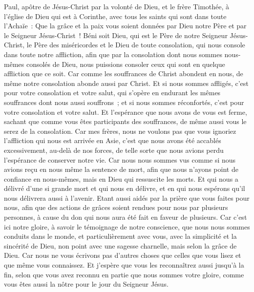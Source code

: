 \begin{multicols}{2}
\VerseOne{}Paul, apôtre de Jésus-Christ par la volonté de Dieu, et le frère Timothée, à l'église de Dieu qui est à Corinthe, avec tous les saints qui sont dans toute l'Achaïe~:
Que la grâce et la paix vous soient données par Dieu notre Père et par le Seigneur Jésus-Christ~!
Béni soit Dieu, qui est le Père de notre Seigneur Jésus-Christ, le Père des miséricordes et le Dieu de toute consolation,
qui nous console dans toute notre affliction, afin que par la consolation dont nous sommes nous-mêmes consolés de Dieu, nous puissions consoler ceux qui sont en quelque affliction que ce soit.
Car comme les souffrances de Christ abondent en nous, de même notre consolation abonde aussi par Christ.
Et si nous sommes affligés, c'est pour votre consolation et votre salut, qui s'opère en endurant les mêmes souffrances dont nous aussi souffrons~; et si nous sommes réconfortés, c'est pour votre consolation et votre salut.
Et l'espérance que nous avons de vous est ferme, sachant que comme vous êtes participants des souffrances, de même aussi vous le serez de la consolation.
Car mes frères, nous ne voulons pas que vous ignoriez l'affliction qui nous est arrivée en Asie, c'est que nous avons été accablés excessivement, au-delà de nos forces, de telle sorte que nous avions perdu l'espérance de conserver notre vie.
Car nous nous sommes vus comme si nous avions reçu en nous même la sentence de mort, afin que nous n'ayons point de confiance en nous-mêmes, mais en Dieu qui ressuscite les morts.
Et qui nous a délivré d'une si grande mort et qui nous en délivre, et en qui nous espérons qu'il nous délivrera aussi à l'avenir.
Etant aussi aidés par la prière que vous faites pour nous, afin que des actions de grâces soient rendues pour nous par plusieurs personnes, à cause du don qui nous aura été fait en faveur de plusieurs.
Car c'est ici notre gloire, à savoir le témoignage de notre conscience, que nous nous sommes conduits dans le monde, et particulièrement avec vous, avec la simplicité et la sincérité de Dieu, non point avec une sagesse charnelle, mais selon la grâce de Dieu.
Car nous ne vous écrivons pas d'autres choses que celles que vous lisez et que même vous connaissez. Et j'espère que vous les reconnaîtrez aussi jusqu'à la fin,
selon que vous avez reconnu en partie que nous sommes votre gloire, comme vous êtes aussi la nôtre pour le jour du Seigneur Jésus.

\end{multicols}

